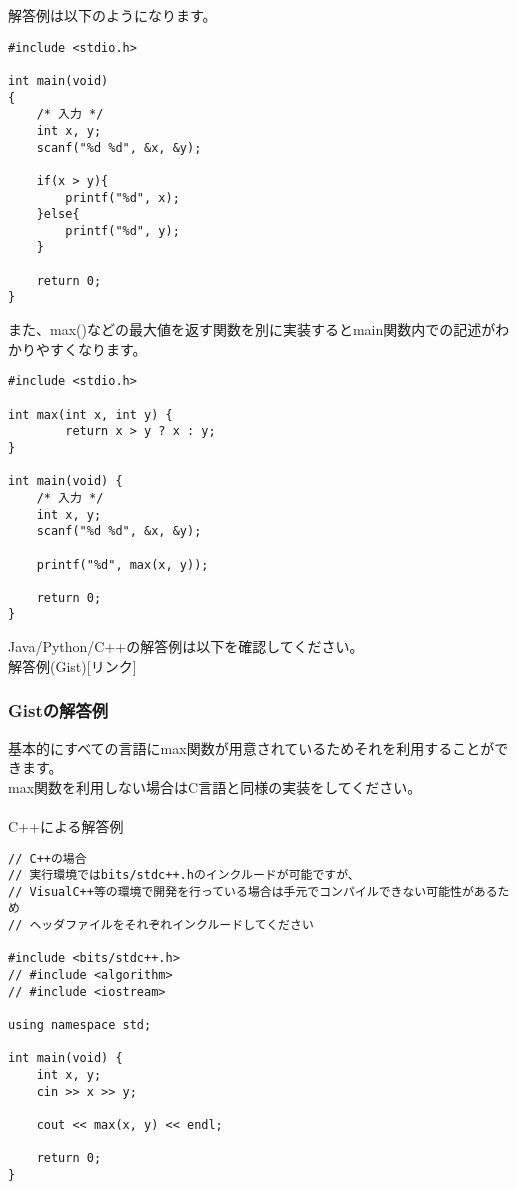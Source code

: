 \noindent
解答例は以下のようになります。

\noindent
\begin{lstlisting}[style = customC]
#include <stdio.h>

int main(void)
{
    /* 入力 */
    int x, y;
    scanf("%d %d", &x, &y);

    if(x > y){
        printf("%d", x);
    }else{
        printf("%d", y);
    }

    return 0;
}
\end{lstlisting}

\noindent
また、max()などの最大値を返す関数を別に実装するとmain関数内での記述がわかりやすくなります。

\noindent
\begin{lstlisting}[style = customC]
#include <stdio.h>

int max(int x, int y) {
        return x > y ? x : y; 
}

int main(void) {
    /* 入力 */
    int x, y;
    scanf("%d %d", &x, &y);

    printf("%d", max(x, y));

    return 0;
}
\end{lstlisting}

\noindent
Java/Python/C++の解答例は以下を確認してください。\\
解答例(Gist)[リンク]

\clearpage

\subsubsection{Gistの解答例}
\noindent
基本的にすべての言語にmax関数が用意されているためそれを利用することができます。\\
max関数を利用しない場合はC言語と同様の実装をしてください。
\\ \\
\noindent
C++による解答例
\begin{lstlisting}[style = customCpp]
// C++の場合
// 実行環境ではbits/stdc++.hのインクルードが可能ですが、
// VisualC++等の環境で開発を行っている場合は手元でコンパイルできない可能性があるため
// ヘッダファイルをそれぞれインクルードしてください

#include <bits/stdc++.h>
// #include <algorithm>
// #include <iostream>

using namespace std;

int main(void) { 
    int x, y;
    cin >> x >> y;

    cout << max(x, y) << endl;
    
    return 0;
}
\end{lstlisting}

